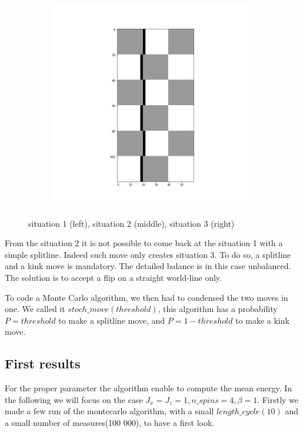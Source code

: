 \documentclass[a4paper,12pt]{article}
\begin{document}
\begin{figure}[H]
\begin{subfigure}[b]{0.3\textwidth}
	 	\end{subfigure}
	 	\begin{subfigure}[b]{0.3\textwidth}
	 		\includegraphics[scale=0.2]{situation3.png}
	 	\end{subfigure}
	 	\caption{situation 1 (left), situation 2 (middle), situation 3 (right)}
	 	\label{flawed detailed balance}			
	 \end{figure}
	 
	 From the situation 2 it is not possible to come back at the situation 1 with a simple splitline. Indeed such move only creates situation 3. To do so, a splitline and a kink move is mandatory. The detailed balance is in this case unbalanced. The solution is to accept a flip on a straight world-line only.
	 
	 To code a Monte Carlo algorithm, we then had to condensed the two moves in one. We called it $stoch\_move(threshold)$, this algorithm has a probability $P = threshold$ to make a splitline move, and $P = 1-threshold$ to make a kink move.
	 
	 \subsection{First results}
	 For the proper parameter the algorithm enable to compute the mean energy. In the following we will focus on the case $J_x = J_z =1, n\_spins = 4, \beta = 1$.
	 Firstly we made a few run of the montecarlo algorithm, with a small $length\_cycle (10)$ and a small number of measures(100 000), to have a first look.
	 
\end{document}
